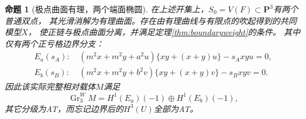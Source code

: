 \documentclass[11pt,a4paper]{ctexart}
\theoremstyle{cnplain}\newtheorem{theorem}{定理}[section]
\newtheorem{proposition}[theorem]{命题}
\theoremstyle{definition}\newtheorem{definition}[theorem]{定义}
\theoremstyle{remark}\newtheorem{remark}[theorem]{注}
\begin{document}
\begin{proposition}[极点曲面有理，两个端面椭圆]\label{prop:injectedgeometry}
在上述开集上，$S_0=V(F)\subset\mathbf P^3$有两个普通双点，
其光滑消解为有理曲面。存在由有理曲线与有限点的吹起得到的共同模型$X$，
使正链与极点曲面分离，并满足定理\ref{thm:boundaryweight}的条件。
其中仅有两个正亏格边界分支：
\begin{align}
 E_a(s_A):\ &(m^2x+m^2y+a^2u)\{xy+(x+y)u\}-s_Axyu=0,\\
 E_b(s_B):\ &(m^2x+m^2y+b^2v)\{xy+(x+y)v\}-s_Bxyv=0.
 \label{eq:twofaceelliptics}
\end{align}
因此该实际完整相对载体$M$满足
\begin{equation}\label{eq:injectedcarrier}
 \operatorname{Gr}^W_3 M=H^1(E_a)(-1)\oplus H^1(E_b)(-1),
\end{equation}
其它分级为AT，而忘记边界后的$H^3(U)$全部为AT。
\end{proposition}
\end{document}
